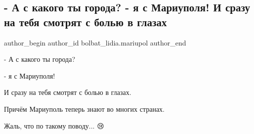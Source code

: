  
 
 
 
 

\subsection{- А с какого ты города? - я с Мариуполя!  И сразу на тебя смотрят с болью в глазах}
\label{sec:20_06_2022.fb.bolbat_lidia.mariupol.1.a_s_kakogo_ty_goroda_ja_s_mariupolja}

\ifcmt
 author_begin
   author_id bolbat_lidia.mariupol
 author_end
\fi

- А с какого ты города?

- я с Мариуполя! 

И сразу на тебя смотрят с болью в глазах. 

Причём Мариуполь теперь знают во многих странах. 

Жаль, что по такому поводу... 😢

